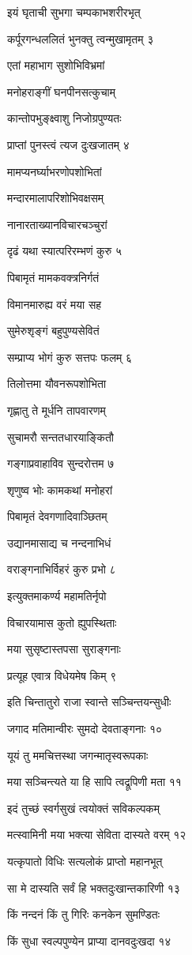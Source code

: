 इयं घृताची सुभगा चम्पकाभशरीरभृत्

कर्पूरगन्धललितं भुनक्तु त्वन्मुखामृतम् ३

एतां महाभाग सुशोभिविभ्रमां

मनोहराङ्गीं घनपीनसत्कुचाम्

कान्तोपभुङ्क्ष्वाशु निजोग्रपुण्यतः

प्राप्तां पुनस्त्वं त्यज दुःखजातम् ४

मामप्यनर्घ्याभरणोपशोभितां

मन्दारमालापरिशोभिवक्षसम्

नानारताख्यानविचारचञ्चुरां

दृढं यथा स्यात्परिरम्भणं कुरु ५

पिबामृतं मामकवक्त्रनिर्गतं

विमानमारुह्य वरं मया सह

सुमेरुशृङ्गं बहुपुण्यसेवितं

सम्प्राप्य भोगं कुरु सत्तपः फलम् ६

तिलोत्तमा यौवनरूपशोभिता

गृह्णातु ते मूर्धनि तापवारणम्

सुचामरौ सन्ततधारयाङ्कितौ

गङ्गाप्रवाहाविव सुन्दरोत्तम ७

शृणुष्व भोः कामकथां मनोहरां

पिबामृतं देवगणादिवाञ्छितम्

उद्यानमासाद्य च नन्दनाभिधं

वराङ्गनाभिर्विहरं कुरु प्रभो ८

इत्युक्तमाकर्ण्य महामतिर्नृपो

विचारयामास कुतो ह्युपस्थिताः

मया सुसृष्टास्तपसा सुराङ्गनाः

प्रत्यूह एवात्र विधेयमेष किम् ९

इति चिन्तातुरो राजा स्वान्ते सञ्चिन्तयन्सुधीः

जगाद मतिमान्वीरः सुमदो देवताङ्गनाः १०

यूयं तु ममचित्तस्था जगन्मातृस्वरूपकाः

मया सञ्चिन्त्यते या हि सापि त्वद्रूपिणी मता ११

इदं तुच्छं स्वर्गसुखं त्वयोक्तं सविकल्पकम्

मत्स्वामिनी मया भक्त्या सेविता दास्यते वरम् १२

यत्कृपातो विधिः सत्यलोकं प्राप्तो महानभूत्

सा मे दास्यति सर्वं हि भक्तदुःखान्तकारिणी १३

किं नन्दनं किं तु गिरिः कनकेन सुमण्डितः

किं सुधा स्वल्पपुण्येन प्राप्या दानवदुःखदा १४

